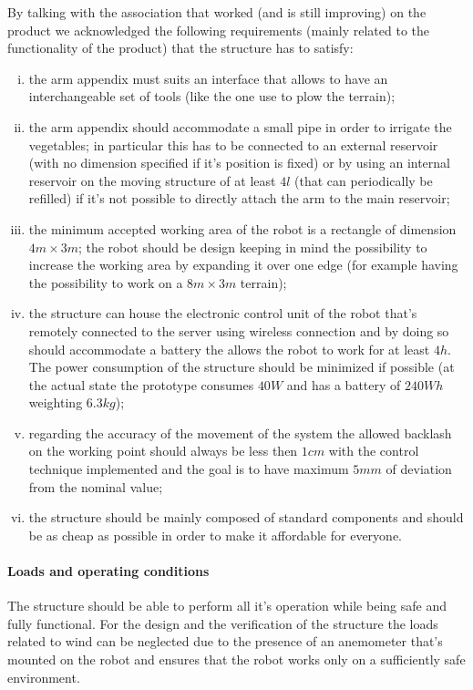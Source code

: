 	By talking with the association that worked (and is still improving) on the product we acknowledged the following requirements (mainly related to the functionality of the product) that the structure has to satisfy:
	\begin{enumerate}[i)]
		\item the arm appendix must suits an interface that allows to have an interchangeable set of tools (like the one use to plow the terrain);
		
		\item the arm appendix should accommodate a small pipe in order to irrigate the vegetables; in particular this has to be connected to an external reservoir (with no dimension specified if it's position is fixed) or by using an internal reservoir on the moving structure of at least $4l$ (that can periodically be refilled) if it's not possible to directly attach the arm to the main reservoir;
		
		\item the minimum accepted working area of the robot is a rectangle of dimension $4m\times 3m$; the robot should be design keeping in mind the possibility to increase the working area by expanding it over one edge (for example having the possibility to work on a $8m\times 3m$ terrain);
		
		\item the structure can house the electronic control unit of the robot that's remotely connected to the server using wireless connection and by doing so should accommodate a battery the allows the robot to work for at least $4h$. The power consumption of the structure should be minimized if possible (at the actual state the prototype consumes $40W$ and has a battery of $240 Wh$ weighting $6.3kg$);
		
		\item regarding the accuracy of the movement of the system the allowed backlash on the working point should always be less then $1cm$ with the control technique implemented and the goal is to have maximum $5mm$ of deviation from the nominal value;
		
		\item the structure should be mainly composed of standard components and should be as cheap as possible in order to make it affordable for everyone.
	\end{enumerate}

	\paragraph{Loads and operating conditions} The structure should be able to perform all it's operation while being safe and fully functional. For the design and the verification of the structure the loads related to wind can be neglected due to the presence of an anemometer that's mounted on the robot and ensures that the robot works only on a sufficiently safe environment.
	
